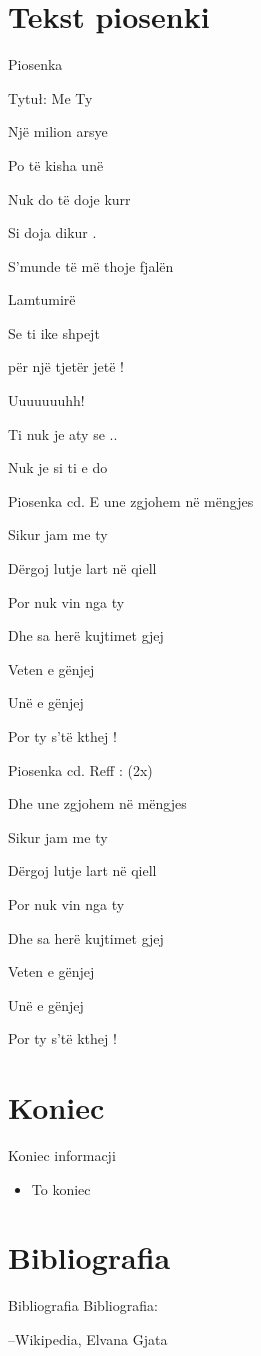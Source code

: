 \documentclass{beamer}
\begin{document}
\section{Tekst piosenki}
\begin{frame}{Piosenka}

Tytuł: Me Ty
\newline

Një milion arsye 

Po të kisha unë 

Nuk do të doje kurr 

Si doja dikur . 

S'munde të më thoje fjalën 

Lamtumirë 

Se ti ike shpejt 

për një tjetër jetë ! 

Uuuuuuuhh! 

Ti nuk je aty se .. 

Nuk je si ti e do 

\end {frame}

\begin{frame}{Piosenka cd.}
E une zgjohem në mëngjes 

Sikur jam me ty 

Dërgoj lutje lart në qiell 

Por nuk vin nga ty 

Dhe sa herë kujtimet gjej 

Veten e gënjej 

Unë e gënjej 

Por ty s'të kthej ! 

\end {frame}
\begin{frame}{Piosenka cd.}
Reff : (2x) 

Dhe une zgjohem në mëngjes 

Sikur jam me ty 

Dërgoj lutje lart në qiell 

Por nuk vin nga ty 

Dhe sa herë kujtimet gjej 

Veten e gënjej 

Unë e gënjej 

Por ty s'të kthej ! 

\end {frame}

\section{Koniec}
\begin{frame}{Koniec informacji}
\begin {itemize}
\item To koniec
\end {itemize}
\end {frame}

\section{Bibliografia}
\begin{frame}{Bibliografia}
Bibliografia:
\begin{thebibliography}{9}
--Wikipedia, Elvana Gjata
\end{thebibliography}
\end{frame}
\end{document}
